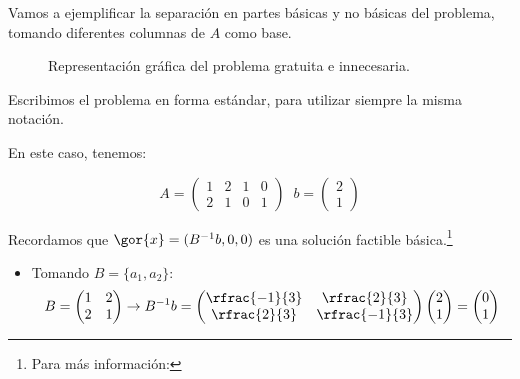 \begin{example}
Vamos a ejemplificar la separación en partes básicas y no básicas del problema, tomando diferentes columnas de $A$ como base.

\begin{ioprob}
\end{ioprob}

\begin{figure}[h]
\centering
{}
\caption{Representación gráfica del problema gratuita e innecesaria.}
\end{figure}

Escribimos el problema en forma estándar, para utilizar siempre la misma notación.

\begin{ioprob}
\end{ioprob}

En este caso, tenemos:

\[A = \begin{pmatrix}1&2&1&0\\2&1&0&1\end{pmatrix}\;\; b = \begin{pmatrix}2\\1\end{pmatrix}\]

Recordamos que $\gor{x} = (B^{-1}b,0,0)$ es una solución factible básica.\footnote{Para más información: }

\begin{itemize}
	\item Tomando $B = \{a_1,a_2\}$:
		\[B = \begin{pmatrix}1&2\\2&1\end{pmatrix} \to B^{-1}b = \begin{pmatrix}\rfrac{-1}{3}&\rfrac{2}{3}\\\rfrac{2}{3}&\rfrac{-1}{3}\end{pmatrix}\begin{pmatrix}2\\1\end{pmatrix} = \begin{pmatrix}0\\1\end{pmatrix}\]


\end{itemize}
\end{example}
